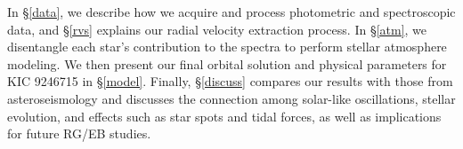 In \S \ref{data}, we describe how we acquire and process photometric and spectroscopic data, and \S \ref{rvs} explains our radial velocity extraction process. In \S \ref{atm}, we disentangle each star's contribution to the spectra to perform stellar atmosphere modeling. We then present our final orbital solution and physical parameters for KIC 9246715 in \S \ref{model}. Finally, \S \ref{discuss} compares our results with those from asteroseismology and discusses the connection among solar-like oscillations, stellar evolution, and effects such as star spots and tidal forces, as well as implications for future RG/EB studies.
